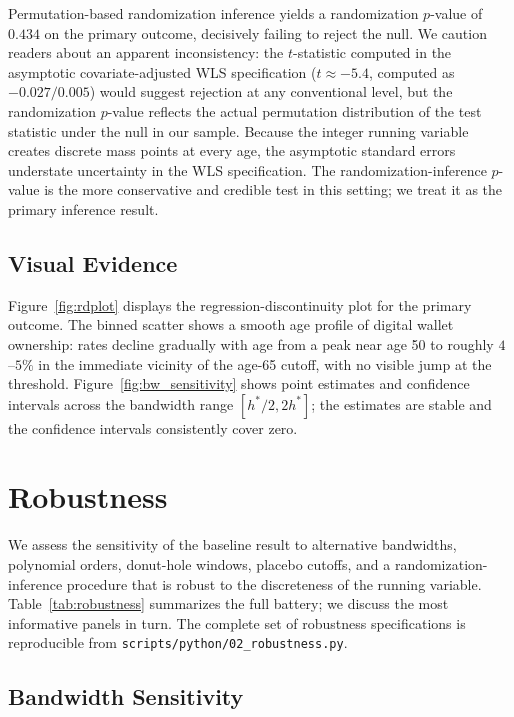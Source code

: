 \documentclass[12pt]{article}
\begin{document}
Permutation-based randomization inference yields a randomization $p$-value of $0.434$ on the primary outcome, decisively failing to reject the null. We caution readers about an apparent inconsistency: the $t$-statistic computed in the asymptotic covariate-adjusted WLS specification ($t \approx -5.4$, computed as $-0.027/0.005$) would suggest rejection at any conventional level, but the randomization $p$-value reflects the actual permutation distribution of the test statistic under the null in our sample. Because the integer running variable creates discrete mass points at every age, the asymptotic standard errors understate uncertainty in the WLS specification. The randomization-inference $p$-value is the more conservative and credible test in this setting; we treat it as the primary inference result.

\subsection{Visual Evidence}
\label{subsec:visual_evidence}

Figure~\ref{fig:rdplot} displays the regression-discontinuity plot for the primary outcome. The binned scatter shows a smooth age profile of digital wallet ownership: rates decline gradually with age from a peak near age 50 to roughly $4$--$5\%$ in the immediate vicinity of the age-65 cutoff, with no visible jump at the threshold. Figure~\ref{fig:bw_sensitivity} shows point estimates and confidence intervals across the bandwidth range $[h^*/2, 2 h^*]$; the estimates are stable and the confidence intervals consistently cover zero.


\section{Robustness}
\label{sec:robustness}

We assess the sensitivity of the baseline result to alternative bandwidths, polynomial orders, donut-hole windows, placebo cutoffs, and a randomization-inference procedure that is robust to the discreteness of the running variable. Table~\ref{tab:robustness} summarizes the full battery; we discuss the most informative panels in turn. The complete set of robustness specifications is reproducible from \texttt{scripts/python/02\_robustness.py}.

\subsection{Bandwidth Sensitivity}
\end{document}
